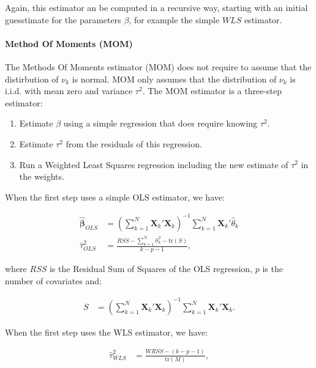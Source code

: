 \documentclass[]{book}
\providecommand{\tightlist}{%
  \setlength{\itemsep}{0pt}\setlength{\parskip}{0pt}}
\let\oldparagraph\paragraph
\renewcommand{\paragraph}[1]{\oldparagraph{#1}\mbox{}}
\theoremstyle{definition}
\theoremstyle{definition}
\theoremstyle{definition}
\theoremstyle{remark}
\begin{document}
Again, this estimator an be computed in a recursive way, starting with an initial guesstimate for the parameters \(\beta\), for example the simple \(WLS\) estimator.

\hypertarget{method-of-moments-mom}{%
\paragraph{Method Of Moments (MOM)}\label{method-of-moments-mom}}

The Methods Of Moments estimator (MOM) does not require to assume that the distirbution of \(\nu_k\) is normal.
MOM only assumes that the distribution of \(\nu_k\) is i.i.d. with mean zero and variance \(\tau^2\).
The MOM estimator is a three-step estimator:

\begin{enumerate}
\def\labelenumi{\arabic{enumi}.}
\tightlist
\item
  Estimate \(\beta\) using a simple regression that does require knowing \(\tau^2\).
\item
  Estimate \(\tau^2\) from the residuals of this regression.
\item
  Run a Weighted Least Squares regression including the new estimate of \(\tau^2\) in the weights.
\end{enumerate}

When the first step uses a simple OLS estimator, we have:

\begin{align*}
  \mathbf{\hat{\beta}}_{OLS} & = \left(\sum_{k=1}^N\mathbf{X}_k'\mathbf{X}_k\right)^{-1}\sum_{k=1}^N\mathbf{X}_k'\hat{\theta}_k \\
  \hat{\tau}^2_{OLS} & = \frac{RSS-\sum_{k=1}^N\hat{\sigma}^2_k-\text{tr}(S)}{k-p-1}, 
\end{align*}

where \(RSS\) is the Residual Sum of Squares of the OLS regression, \(p\) is the number of covariates and:

\begin{align*}
S & = \left(\sum_{k=1}^N\mathbf{X}_k'\mathbf{X}_k\right)^{-1}\sum_{k=1}^N\mathbf{X}_k'\mathbf{X}_k.
\end{align*}

When the first step uses the WLS estimator, we have:

\begin{align*}
  \hat{\tau}^2_{WLS} & = \frac{WRSS-(k-p-1)}{\text{tr}(M)}, 
\end{align*}
\end{document}
